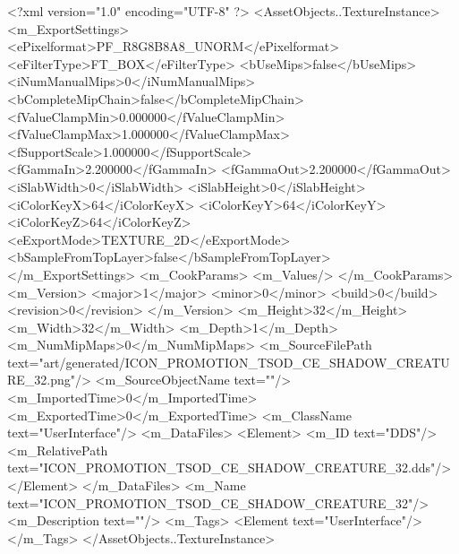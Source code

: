 <?xml version="1.0" encoding="UTF-8" ?>
<AssetObjects..TextureInstance>
	<m_ExportSettings>
		<ePixelformat>PF_R8G8B8A8_UNORM</ePixelformat>
		<eFilterType>FT_BOX</eFilterType>
		<bUseMips>false</bUseMips>
		<iNumManualMips>0</iNumManualMips>
		<bCompleteMipChain>false</bCompleteMipChain>
		<fValueClampMin>0.000000</fValueClampMin>
		<fValueClampMax>1.000000</fValueClampMax>
		<fSupportScale>1.000000</fSupportScale>
		<fGammaIn>2.200000</fGammaIn>
		<fGammaOut>2.200000</fGammaOut>
		<iSlabWidth>0</iSlabWidth>
		<iSlabHeight>0</iSlabHeight>
		<iColorKeyX>64</iColorKeyX>
		<iColorKeyY>64</iColorKeyY>
		<iColorKeyZ>64</iColorKeyZ>
		<eExportMode>TEXTURE_2D</eExportMode>
		<bSampleFromTopLayer>false</bSampleFromTopLayer>
	</m_ExportSettings>
	<m_CookParams>
		<m_Values/>
	</m_CookParams>
	<m_Version>
		<major>1</major>
		<minor>0</minor>
		<build>0</build>
		<revision>0</revision>
	</m_Version>
	<m_Height>32</m_Height>
	<m_Width>32</m_Width>
	<m_Depth>1</m_Depth>
	<m_NumMipMaps>0</m_NumMipMaps>
	<m_SourceFilePath text="art/generated/ICON_PROMOTION_TSOD_CE_SHADOW_CREATURE_32.png"/>
	<m_SourceObjectName text=""/>
	<m_ImportedTime>0</m_ImportedTime>
	<m_ExportedTime>0</m_ExportedTime>
	<m_ClassName text="UserInterface"/>
	<m_DataFiles>
		<Element>
			<m_ID text="DDS"/>
			<m_RelativePath text="ICON_PROMOTION_TSOD_CE_SHADOW_CREATURE_32.dds"/>
		</Element>
	</m_DataFiles>
	<m_Name text="ICON_PROMOTION_TSOD_CE_SHADOW_CREATURE_32"/>
	<m_Description text=""/>
	<m_Tags>
		<Element text="UserInterface"/>
	</m_Tags>
</AssetObjects..TextureInstance>
